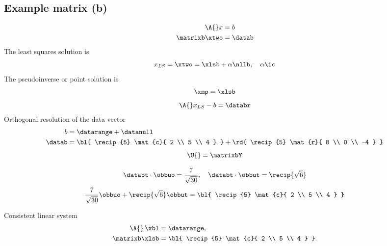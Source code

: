 \subsection{Example matrix (b)}
\begin{equation}
  \begin{split}
    \A{} x &= b \\
    \matrixb \xtwo &= \datab
  \end{split}
\end{equation}
%
The least squares solution is
%
\begin{equation}
  x_{LS} = \xtwo = \xlsb + \alpha \nllb, \quad \alpha\ic
\end{equation}
%
The pseudoinverse or point solution is
%
\begin{equation}
  \xmp = \xlsb
\end{equation}
%
\begin{equation}
  \A{}x_{LS} - b = \databr
\end{equation}
%
Orthogonal resolution of the data vector
%
\begin{equation}
  \begin{split}
     b &= \datarange + \datanull \\
     \datab &= {\bl{ \recip{5} \mat{c}{ 2 \\ 5 \\ 4 } }} + {\rd{ \recip{5} \mat{r}{ 8 \\ 0 \\ -4 } }}
  \end{split}
\end{equation}
%
\begin{equation}
  \U{} = \matrixbY
\end{equation}

%
\begin{equation}
  \databt \cdot \obbuo = \frac{7}{\sqrt{30}}, \quad \databt \cdot \obbut = \recip{\sqrt{6}}
\end{equation}
%
\begin{equation}
  \frac{7}{\sqrt{30}} \obbuo + \recip{\sqrt{6}} \obbut = {\bl{ \recip{5} \mat{c}{ 2 \\ 5 \\ 4 } }}
\end{equation}


%
Consistent linear system
\begin{equation}
  \begin{split}
    \A{}\, \xbl &= \datarange, \\
    \matrixb \xlsb &= {\bl{ \recip{5} \mat{c}{ 2 \\ 5 \\ 4 } }} .
  \end{split}
\end{equation}

